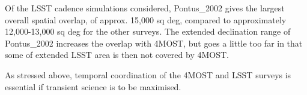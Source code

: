 
Of the LSST cadence simulations considered, Pontus\_2002 gives the
largest overall spatial overlap, of approx. 15,000 sq deg, compared to
approximately 12,000-13,000 sq deg for the other surveys. The extended
declination range of Pontus\_2002 increases the overlap with 4MOST,
but goes a little too far in that some of extended LSST area is then
not covered by 4MOST.

As stressed above, temporal coordination of the 4MOST and LSST surveys is
essential if transient science is to be maximised.
